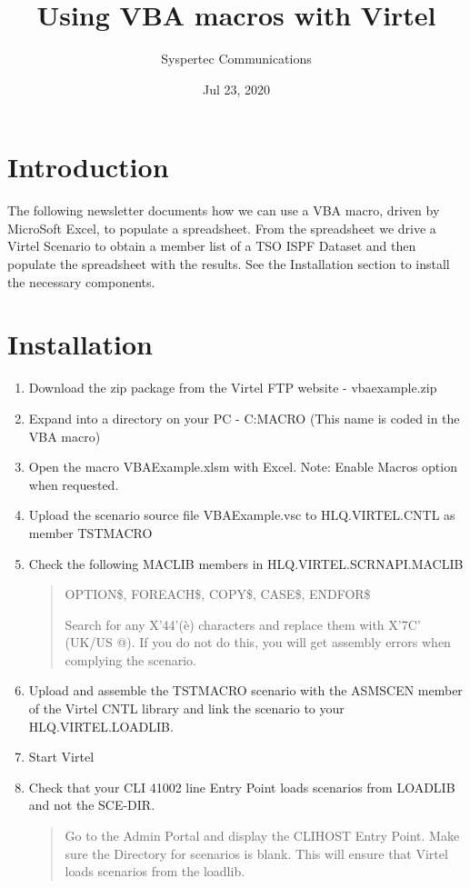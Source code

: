 \documentclass[letterpaper,10pt,english]{sphinxmanual}
\title{Using VBA macros with Virtel}
\date{Jul 23, 2020}
\author{Syspertec Communications}
\begin{document}
\pagestyle{empty}
\sphinxmaketitle
\pagestyle{plain}
\sphinxtableofcontents
\pagestyle{normal}
\label{\detokenize{TN201904::doc}}



\chapter{Introduction}
\label{\detokenize{TN201904:introduction}}
The following newsletter documents how we can use a VBA macro, driven by MicroSoft Excel, to populate a spreadsheet. From the spreadsheet we drive a Virtel Scenario to obtain a member list of a TSO ISPF Dataset and then populate the spreadsheet with the results. See the Installation section to install the necessary components.


\chapter{Installation}
\label{\detokenize{TN201904:installation}}\begin{enumerate}
\def\theenumi{\arabic{enumi}}
\def\labelenumi{\theenumi .}
\makeatletter\def\p@enumii{\p@enumi \theenumi .}\makeatother
\item {} 
Download the zip package from the Virtel FTP website - vbaexample.zip

\item {} 
Expand into a directory on your PC - C:MACRO     (This name is coded in the VBA macro)

\item {} 
Open the macro VBAExample.xlsm with Excel. Note: Enable Macros option when requested.

\item {} 
Upload the scenario source file VBAExample.vsc to HLQ.VIRTEL.CNTL as member TSTMACRO

\item {} 
Check the following MACLIB members in HLQ.VIRTEL.SCRNAPI.MACLIB
\begin{quote}

OPTION\$, FOREACH\$, COPY\$, CASE\$, ENDFOR\$

Search for any X’44’(è) characters and replace them with X’7C’ (UK/US @). If you do not do this, you will get assembly errors when complying the scenario.
\end{quote}

\item {} 
Upload and assemble the TSTMACRO scenario with the ASMSCEN member of the Virtel CNTL library and link the scenario to your HLQ.VIRTEL.LOADLIB.

\item {} 
Start Virtel

\item {} 
Check that your CLI 41002 line Entry Point loads scenarios from LOADLIB and not the SCE-DIR.
\begin{quote}

Go to the Admin Portal and display the CLIHOST Entry Point. Make sure the Directory for scenarios is blank. This will ensure that Virtel loads scenarios from the loadlib.
\end{quote}

\end{enumerate}
\end{document}
